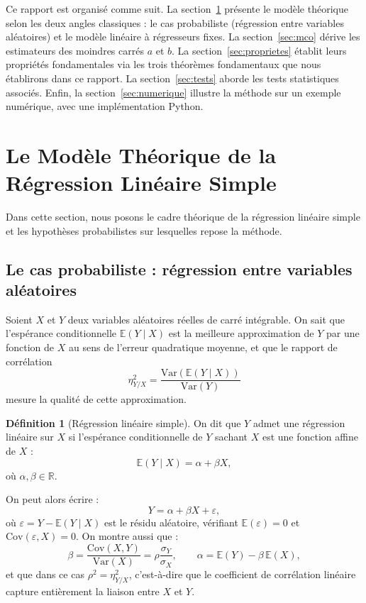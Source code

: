 \documentclass[12pt,a4paper]{article}
\theoremstyle{definition}
\newtheorem{definition}[theoreme]{Définition}
\theoremstyle{remark}
\newcommand{\Esp}{\mathbb{E}}
\newcommand{\Var}{\mathrm{Var}}
\newcommand{\Cov}{\mathrm{Cov}}
\begin{document}
Ce rapport est organisé comme suit.
La section~\ref{sec:modele} présente le modèle théorique selon les deux angles
classiques : le cas probabiliste (régression entre variables aléatoires) et le
modèle linéaire à régresseurs fixes.
La section~\ref{sec:mco} dérive les estimateurs des moindres carrés $a$ et $b$.
La section~\ref{sec:proprietes} établit leurs propriétés fondamentales via les
trois théorèmes fondamentaux que nous établirons dans ce rapport.
La section~\ref{sec:tests} aborde les tests statistiques associés.
Enfin, la section~\ref{sec:numerique} illustre la méthode sur un exemple numérique,
avec une implémentation Python.




\section{Le Modèle Théorique de la Régression Linéaire Simple}

\label{sec:modele}

Dans cette section, nous posons le cadre théorique de la régression linéaire simple
et les hypothèses probabilistes sur lesquelles repose la méthode.
\midskip
\subsection{Le cas probabiliste : régression entre variables aléatoires}

Soient $X$ et $Y$ deux variables aléatoires réelles de carré intégrable.
On sait que l'espérance conditionnelle $\Esp(Y \mid X)$ est la meilleure
approximation de $Y$ par une fonction de $X$ au sens de l'erreur quadratique
moyenne, et que le rapport de corrélation
\[
  \eta^2_{Y/X} = \frac{\Var(\Esp(Y \mid X))}{\Var(Y)}
\]
mesure la qualité de cette approximation.

\begin{definition}[Régression linéaire simple]
\label{def:reglin}
On dit que $Y$ admet une régression linéaire sur $X$ si l'espérance
conditionnelle de $Y$ sachant $X$ est une fonction affine de $X$ :
\begin{equation}
  \label{eq:modeleproba}
  \Esp(Y \mid X) = \alpha + \beta X,
\end{equation}
où $\alpha, \beta \in \mathbb{R}$.
\end{definition}

\noindent On peut alors écrire :
\begin{equation}
  \label{eq:decompY}
  Y = \alpha + \beta X + \varepsilon,
\end{equation}
où $\varepsilon = Y - \Esp(Y \mid X)$ est le résidu aléatoire, vérifiant
$\Esp(\varepsilon) = 0$ et $\Cov(\varepsilon, X) = 0$.
On montre aussi que :
\[
  \beta = \frac{\Cov(X,Y)}{\Var(X)} = \rho \frac{\sigma_Y}{\sigma_X},
  \qquad
  \alpha = \Esp(Y) - \beta\,\Esp(X),
\]
et que dans ce cas $\rho^2 = \eta^2_{Y/X}$, c'est-à-dire que le coefficient de
corrélation linéaire capture entièrement la liaison entre $X$ et $Y$.
\end{document}

